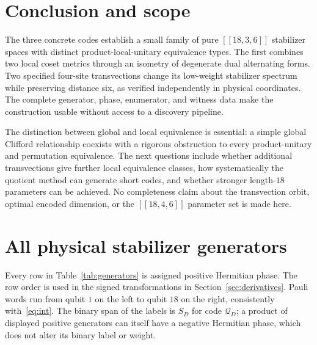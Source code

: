 \documentclass[11pt,a4paper]{article}
\begin{document}
\section{Conclusion and scope}
The three concrete codes establish a small family of pure $[[18,3,6]]$ stabilizer spaces with distinct product-local-unitary equivalence types. The first combines two local coset metrics through an isometry of degenerate dual alternating forms. Two specified four-site transvections change its low-weight stabilizer spectrum while preserving distance six, as verified independently in physical coordinates. The complete generator, phase, enumerator, and witness data make the construction usable without access to a discovery pipeline.

The distinction between global and local equivalence is essential: a simple global Clifford relationship coexists with a rigorous obstruction to every product-unitary and permutation equivalence. The next questions include whether additional transvections give further local equivalence classes, how systematically the quotient method can generate short codes, and whether stronger length-$18$ parameters can be achieved. No completeness claim about the transvection orbit, optimal encoded dimension, or the $[[18,4,6]]$ parameter set is made here.

\appendix
\section{All physical stabilizer generators}\label{app:generators}
Every row in Table~\ref{tab:generators} is assigned positive Hermitian phase. The row order is used in the signed transformations in Section~\ref{sec:derivatives}. Pauli words run from qubit $1$ on the left to qubit $18$ on the right, consistently with~\eqref{eq:int}. The binary span of the labels is $S_D$ for code $\mathcal Q_D$; a product of displayed positive generators can itself have a negative Hermitian phase, which does not alter its binary label or weight.
\end{document}
